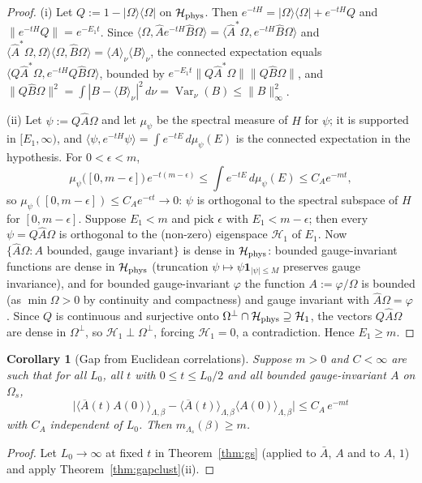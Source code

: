 \documentclass[11pt,a4paper]{article}
\newtheorem{corollary}[theorem]{Corollary}
\theoremstyle{definition}
\theoremstyle{remark}
\DeclareMathOperator{\Var}{Var}
\newcommand{\cH}{\mathcal{H}}
\newcommand{\hA}{\hat{A}}
\newcommand{\hB}{\hat{B}}
\newcommand{\ip}[2]{\langle #1,#2\rangle}
\newcommand{\norm}[1]{\lVert #1\rVert}
\begin{document}
\begin{proof}
(i) Let $Q:=1-|\Omega\rangle\langle\Omega|$ on $\cH_{\rm phys}$. Then $e^{-tH}=|\Omega\rangle\langle\Omega|+e^{-tH}Q$
and $\norm{e^{-tH}Q}=e^{-E_1t}$. Since $\ip\Omega{\hA e^{-tH}\hB\Omega}=\ip{\hA^*\Omega}{e^{-tH}\hB\Omega}$ and
$\ip{\hA^*\Omega}{\Omega}\ip\Omega{\hB\Omega}=\langle A\rangle_\nu\langle B\rangle_\nu$, the connected expectation
equals $\ip{Q\hA^*\Omega}{e^{-tH}Q\hB\Omega}$, bounded by $e^{-E_1t}\norm{Q\hA^*\Omega}\norm{Q\hB\Omega}$, and
$\norm{Q\hB\Omega}^2=\int|B-\langle B\rangle_\nu|^2\,d\nu=\Var_\nu(B)\le\norm B_\infty^2$.

(ii) Let $\psi:=Q\hA\Omega$ and let $\mu_\psi$ be the spectral measure of $H$ for $\psi$; it is supported in
$[E_1,\infty)$, and $\ip\psi{e^{-tH}\psi}=\int e^{-tE}\,d\mu_\psi(E)$ is the connected expectation in the hypothesis.
For $0<\epsilon<m$,
\[
\mu_\psi\bigl([0,m-\epsilon]\bigr)\,e^{-t(m-\epsilon)}\le\int e^{-tE}\,d\mu_\psi(E)\le C_Ae^{-mt},
\]
so $\mu_\psi([0,m-\epsilon])\le C_Ae^{-\epsilon t}\to0$: $\psi$ is orthogonal to the spectral subspace of $H$ for
$[0,m-\epsilon]$. Suppose $E_1<m$ and pick $\epsilon$ with $E_1<m-\epsilon$; then every $\psi=Q\hA\Omega$ is orthogonal
to the (non-zero) eigenspace $\cH_1$ of $E_1$. Now $\{\hA\Omega: A\text{ bounded, gauge invariant}\}$ is dense in
$\cH_{\rm phys}$: bounded gauge-invariant functions are dense in $\cH_{\rm phys}$ (truncation $\psi\mapsto\psi\mathbf 1_{|\psi|\le M}$
preserves gauge invariance), and for bounded gauge-invariant $\varphi$ the function $A:=\varphi/\Omega$ is bounded
(as $\min\Omega>0$ by continuity and compactness) and gauge invariant with $\hA\Omega=\varphi$. Since $Q$ is continuous and
surjective onto $\Omega^\perp\cap\cH_{\rm phys}\supseteq\cH_1$, the vectors $Q\hA\Omega$ are dense in $\Omega^\perp$,
so $\cH_1\perp\Omega^\perp$, forcing $\cH_1=0$, a contradiction. Hence $E_1\ge m$.
\end{proof}

\begin{corollary}[Gap from Euclidean correlations]\label{cor:gapfromcorr}
Suppose $m>0$ and $C<\infty$ are such that for all $L_0$, all $t$ with $0\le t\le L_0/2$ and all bounded gauge-invariant
$A$ on $\Omega_s$,
\[
\bigl|\langle\overline{A}(t)A(0)\rangle_{\Lambda,\beta}-\langle\overline{A}(t)\rangle_{\Lambda,\beta}\langle A(0)\rangle_{\Lambda,\beta}\bigr|
\le C_A\,e^{-mt}
\]
with $C_A$ independent of $L_0$. Then $m_{\Lambda_s}(\beta)\ge m$.
\end{corollary}

\begin{proof}
Let $L_0\to\infty$ at fixed $t$ in Theorem~\ref{thm:gs} (applied to $\bar A$, $A$ and to $A$, $1$) and apply
Theorem~\ref{thm:gapclust}(ii).
\end{proof}
\end{document}
